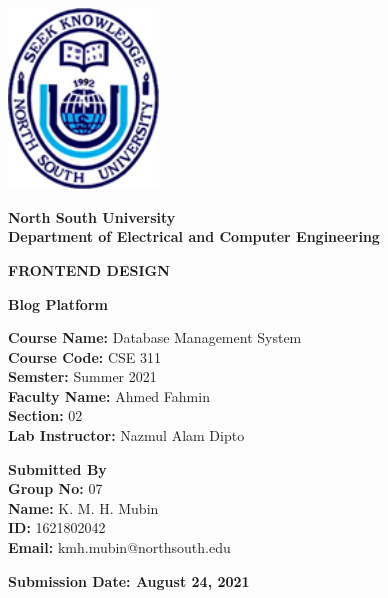 \documentclass{article}
\begin{document}
\begin{titlepage}
\begin{center}
\includegraphics[width=4cm]{NSU_LOGO.png}
\vspace{0.5cm}

\textbf{\LARGE North South University} \\
\vspace{0.5cm}
\textbf{\Large Department of Electrical and Computer Engineering}\\
\vspace{0.5cm}

\textbf{\MakeUppercase{Frontend Design}}

\vspace{1cm}

\textbf{\LARGE Blog Platform}

\vspace{0.7cm}
   
\end{center}

\begin{flushleft}

\textbf{Course Name:} Database Management System\\
\textbf{Course Code:} CSE 311\\
\textbf{Semster:} Summer 2021 \\
\textbf{Faculty Name:} Ahmed Fahmin\\
\textbf{Section:} 02\\
\textbf{Lab Instructor:} Nazmul Alam Dipto\\

\vspace{1cm}

\textbf{\large Submitted By}\\
\vspace{0.3cm}
\textbf{Group No:} 07\\
\textbf{Name:} K. M. H. Mubin\\
\textbf{ID:} 1621802042\\
\textbf{Email:} kmh.mubin@northsouth.edu\\

\vspace{1cm}

\end{flushleft}

\vspace*{\fill}
\centering
\textbf{\Large Submission Date: August 24, 2021}

\end{titlepage}
\end{document}
